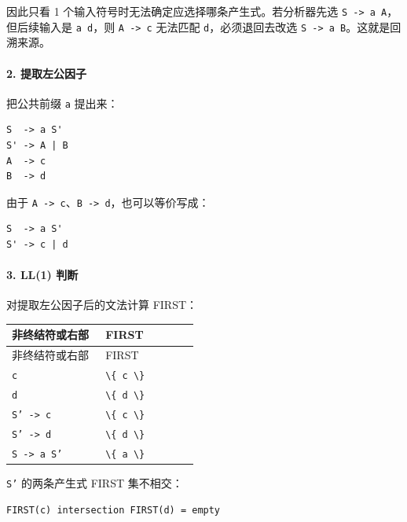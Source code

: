 \documentclass[UTF8]{ctexart}
\begin{document}
因此只看 1 个输入符号时无法确定应选择哪条产生式。若分析器先选 \texttt{S -> a A}，但后续输入是 \texttt{a d}，则 \texttt{A -> c} 无法匹配 \texttt{d}，必须退回去改选 \texttt{S -> a B}。这就是回溯来源。

\paragraph*{2. 提取左公因子}

把公共前缀 \texttt{a} 提出来：

\begin{Verbatim}[fontsize=\small,breaklines=true]
S  -> a S'
S' -> A | B
A  -> c
B  -> d
\end{Verbatim}

由于 \texttt{A -> c}、\texttt{B -> d}，也可以等价写成：

\begin{Verbatim}[fontsize=\small,breaklines=true]
S  -> a S'
S' -> c | d
\end{Verbatim}

\paragraph*{3. LL(1) 判断}

对提取左公因子后的文法计算 FIRST：

\begin{longtable}{|p{0.47\linewidth}|p{0.47\linewidth}|}
\hline
非终结符或右部 & FIRST \\
\hline
\endfirsthead
非终结符或右部 & FIRST \\
\hline
\endhead
\texttt{c} & \texttt{\textbackslash{}\{ c \textbackslash{}\}} \\
\hline
\texttt{d} & \texttt{\textbackslash{}\{ d \textbackslash{}\}} \\
\hline
\texttt{S' -> c} & \texttt{\textbackslash{}\{ c \textbackslash{}\}} \\
\hline
\texttt{S' -> d} & \texttt{\textbackslash{}\{ d \textbackslash{}\}} \\
\hline
\texttt{S -> a S'} & \texttt{\textbackslash{}\{ a \textbackslash{}\}} \\
\hline
\end{longtable}

\texttt{S'} 的两条产生式 FIRST 集不相交：

\begin{Verbatim}[fontsize=\small,breaklines=true]
FIRST(c) intersection FIRST(d) = empty
\end{Verbatim}
\end{document}
